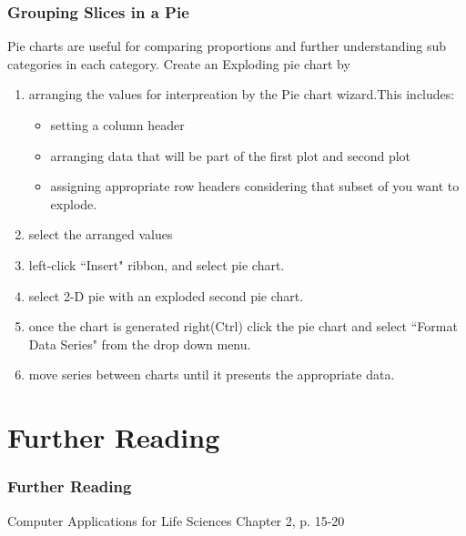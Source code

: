 \documentclass[12pt]{beamer}
\begin{document}
	\begin{frame}
		\frametitle{Grouping Slices in a Pie}
		Pie charts are useful for comparing proportions and further understanding sub categories in each category. 
		Create an Exploding pie chart by
		\begin{enumerate}
			\item arranging the values for interpreation by the Pie chart wizard.This includes:
				\begin{itemize}
					\item setting a column header 
					\item arranging data that will be part of the first plot and second plot
					\item assigning appropriate row headers considering that subset of you want to explode.
				\end{itemize}
		\item select the arranged values
		\item left-click ``Insert" ribbon, and select pie chart.
		\item select 2-D pie with an exploded second pie chart.
		\item once the chart is generated right(Ctrl) click the pie chart and select ``Format Data Series" from the drop down menu.
		\item move series between charts until it presents the appropriate data. 
	\end{enumerate}
	\end{frame}

	
\section{Further Reading}
	\begin{frame}
		\frametitle{Further Reading}
		Computer Applications for Life Sciences Chapter 2, p. 15-20
	\end{frame}
\end{document}
